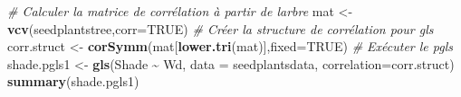 \documentclass[
]{book}
\newenvironment{Shaded}{\begin{snugshade}}{\end{snugshade}}
\newcommand{\AttributeTok}[1]{\textcolor[rgb]{0.13,0.29,0.53}{#1}}
\newcommand{\CommentTok}[1]{\textcolor[rgb]{0.56,0.35,0.01}{\textit{#1}}}
\newcommand{\ConstantTok}[1]{\textcolor[rgb]{0.56,0.35,0.01}{#1}}
\newcommand{\FunctionTok}[1]{\textcolor[rgb]{0.13,0.29,0.53}{\textbf{#1}}}
\newcommand{\NormalTok}[1]{#1}
\newcommand{\OtherTok}[1]{\textcolor[rgb]{0.56,0.35,0.01}{#1}}
\newcommand{\SpecialCharTok}[1]{\textcolor[rgb]{0.81,0.36,0.00}{\textbf{#1}}}
\begin{document}
\begin{Shaded}
\begin{Highlighting}[]
\CommentTok{\# Calculer la matrice de corrélation à partir de l\textquotesingle{}arbre}
\NormalTok{mat }\OtherTok{\textless{}{-}} \FunctionTok{vcv}\NormalTok{(seedplantstree,}\AttributeTok{corr=}\ConstantTok{TRUE}\NormalTok{)}
\CommentTok{\# Créer la structure de corrélation pour gls}
\NormalTok{corr.struct }\OtherTok{\textless{}{-}} \FunctionTok{corSymm}\NormalTok{(mat[}\FunctionTok{lower.tri}\NormalTok{(mat)],}\AttributeTok{fixed=}\ConstantTok{TRUE}\NormalTok{)}
\CommentTok{\# Exécuter le pgls}
\NormalTok{shade.pgls1 }\OtherTok{\textless{}{-}} \FunctionTok{gls}\NormalTok{(Shade }\SpecialCharTok{\textasciitilde{}}\NormalTok{ Wd, }\AttributeTok{data =}\NormalTok{ seedplantsdata, }\AttributeTok{correlation=}\NormalTok{corr.struct)}
\FunctionTok{summary}\NormalTok{(shade.pgls1)}
\end{Highlighting}
\end{Shaded}
\end{document}
